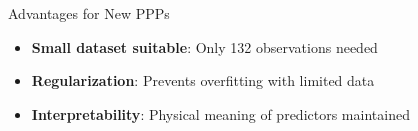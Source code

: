 \documentclass[aspectratio=43]{beamer}
\begin{document}
\begin{frame}
\begin{columns}
\begin{column}{0.5\textwidth}
            \begin{alertblock}{Advantages for New PPPs}
                \scriptsize
                \begin{itemize}
                    \item \textbf{Small dataset suitable}: Only 132 observations needed
                    \item \textbf{Regularization}: Prevents overfitting with limited data
                    \item \textbf{Interpretability}: Physical meaning of predictors maintained
                \end{itemize}
            \end{alertblock}
        \end{column}
    \end{columns}
\end{frame}

\end{document}
